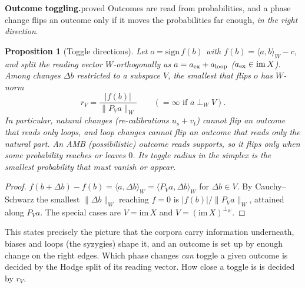 \documentclass[11pt]{article}
\newtheorem{proposition}[theorem]{Proposition}
\theoremstyle{definition}
\theoremstyle{remark}
\newcommand{\st}[1]{\textsf{\small\color{gray}#1}}
\begin{document}
\textbf{Outcome toggling.}\st{proved}
Outcomes are read from probabilities, and a phase change flips an outcome only if it moves the probabilities far enough, \emph{in the right direction}.
\begin{proposition}[Toggle directions]\label{prop:toggle}
Let $o=\mathrm{sign}\,f(b)$ with $f(b)=\langle a,b\rangle_W-c$, and split the reading vector $W$-orthogonally as $a=a_{\rm ex}+a_{\rm loop}$ ($a_{\rm ex}\in\mathrm{im}\,X$). Among changes $\Delta b$ restricted to a subspace $V$, the smallest that flips $o$ has $W$-norm
\[
r_V=\frac{|f(b)|}{\|P_Va\|_W}\qquad(=\infty\text{ if }a\perp_W V).
\]
In particular, natural changes (re-calibrations $u_s+v_t$) cannot flip an outcome that reads only loops, and loop changes cannot flip an outcome that reads only the natural part. An AMB (possibilistic) outcome reads supports, so it flips only when some probability reaches or leaves $0$. Its toggle radius in the simplex is the smallest probability that must vanish or appear.
\end{proposition}
\begin{proof}
$f(b+\Delta b)-f(b)=\langle a,\Delta b\rangle_W=\langle P_Va,\Delta b\rangle_W$ for $\Delta b\in V$. By Cauchy--Schwarz the smallest $\|\Delta b\|_W$ reaching $f=0$ is $|f(b)|/\|P_Va\|_W$, attained along $P_Va$. The special cases are $V=\mathrm{im}\,X$ and $V=(\mathrm{im}\,X)^{\perp_W}$.
\end{proof}
This states precisely the picture that the corpora carry information underneath, biases and loops (the syzygies) shape it, and an outcome is set up by enough change on the right edges. Which phase changes \emph{can} toggle a given outcome is decided by the Hodge split of its reading vector. How close a toggle is is decided by $r_V$.
\end{document}
